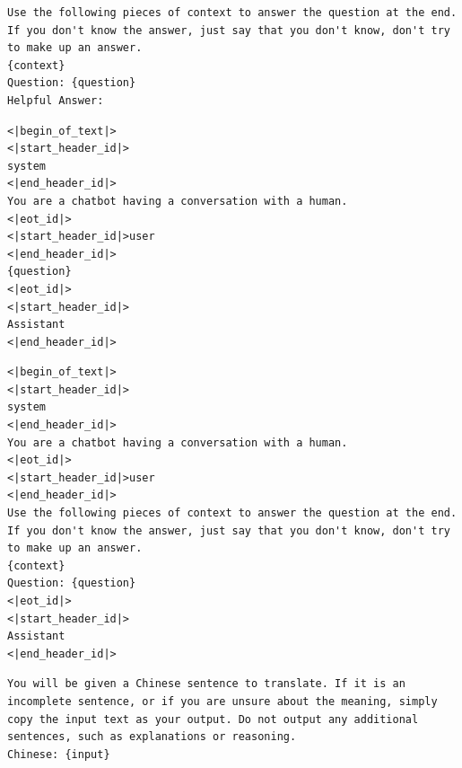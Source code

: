 \begin{listing}[H]
\begin{verbatim}
Use the following pieces of context to answer the question at the end. If you don't know the answer, just say that you don't know, don't try to make up an answer.
{context}
Question: {question}
Helpful Answer:
\end{verbatim}
\caption{RAG - Generic Prompt template for question answering. The placeholders \textit{\{question\}} and \textit{\{context\}} will be filled with the question and the retrieved data, respectively.}
\label{list:rag-generic}
\end{listing}

\begin{listing}[H]
\begin{verbatim}
<|begin_of_text|>
<|start_header_id|>
system
<|end_header_id|>
You are a chatbot having a conversation with a human.
<|eot_id|>
<|start_header_id|>user
<|end_header_id|>
{question}
<|eot_id|>
<|start_header_id|>
Assistant
<|end_header_id|>
\end{verbatim}
\caption{Non-RAG prompt template for question answering with Llama-3 models. The placeholder \textit{\{question\}} will be filled with the question.}
\label{list:non-rag}
\end{listing}

\begin{listing}[H]
\begin{verbatim}
<|begin_of_text|>
<|start_header_id|>
system
<|end_header_id|>
You are a chatbot having a conversation with a human.
<|eot_id|>
<|start_header_id|>user
<|end_header_id|>
Use the following pieces of context to answer the question at the end. If you don't know the answer, just say that you don't know, don't try to make up an answer.
{context}
Question: {question}
<|eot_id|>
<|start_header_id|>
Assistant
<|end_header_id|>
\end{verbatim}
\caption{RAG - Chat Template for Llama-3 models. The placeholders \textit{\{question\}} and \textit{\{context\}} will be filled with the question and retrieved data, respectively.}
\label{list:rag-chat}
\end{listing}

\begin{listing}[H]
\begin{verbatim}
You will be given a Chinese sentence to translate. If it is an incomplete sentence, or if you are unsure about the meaning, simply copy the input text as your output. Do not output any additional sentences, such as explanations or reasoning.
Chinese: {input}
\end{verbatim}
\caption{Machine Translation - Generic Prompt (\mtgen) for all models. The placeholder \textit{\{input\}} will be filled with the Chinese sentence retrieved from the \mac testing set.}
\label{list:mt-generic}
\end{listing}

